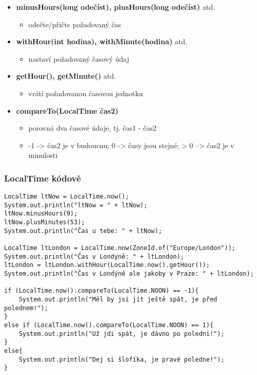 \documentclass[11pt,a4paper,titlepage]{article}
\begin{document}
\begin{itemize}
    \item \textbf{minusHours(long odečíst), plusHours(long odečíst)} atd.
    \begin{itemize}
        \item odečte/přičte požadovaný čas
    \end{itemize}
    \item \textbf{withHour(int hodina), withMinute(hodina)} atd.
    \begin{itemize}
        \item nastaví požadovaný časový údaj
    \end{itemize}
    \item \textbf{getHour(), getMinute()} atd.
    \begin{itemize}
        \item vrátí požadovanou časovou jednotku
    \end{itemize}
    \item \textbf{compareTo(LocalTime čas2)}
    \begin{itemize}
        \item porovná dva časové údaje, tj. čas1 - čas2
        \item -1 -> čas2 je v budoucnu; 0 -> časy jsou stejné; > 0 --> čas2 je v minulosti
    \end{itemize}
\end{itemize}
\parencite{java8_localtime}\newline
\subsubsection{LocalTime kódově}
\begin{verbatim}
LocalTime ltNow = LocalTime.now();
System.out.println("ltNow = " + ltNow);
ltNow.minusHours(9);
ltNow.plusMinutes(53);
System.out.println("Čas u tebe: " + ltNow);

LocalTime ltLondon = LocalTime.now(ZoneId.of("Europe/London"));
System.out.println("Čas v Londýně: " + ltLondon);
ltLondon = ltLondon.withHour(LocalTime.now().getHour());
System.out.println("Čas v Londýně ale jakoby v Praze: " + ltLondon);

if (LocalTime.now().compareTo(LocalTime.NOON) == -1){
    System.out.println("Měl by jsi jít ještě spát, je před polednem!");
}
else if (LocalTime.now().compareTo(LocalTime.NOON) == 1){
    System.out.println("Už jdi spát, je dávno po poledni!");
}
else{
    System.out.println("Dej si šlofíka, je pravé poledne!");
}
\end{verbatim}
\end{document}
